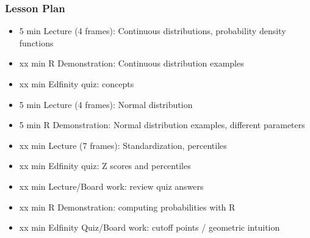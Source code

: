 \begin{frame}
    \frametitle{Lesson Plan}
    \begin{itemize}
        \item 5 min Lecture (4 frames): Continuous distributions, probability density functions
        \item xx min R Demonstration: Continuous distribution examples
        \item xx min Edfinity quiz: concepts

        \item 5 min Lecture (4 frames): Normal distribution
        \item 5 min R Demonstration: Normal distribution examples, different parameters
        \item xx min Lecture (7 frames): Standardization, percentiles
        \item xx min Edfinity quiz: Z scores and percentiles
        \item xx min Lecture/Board work: review quiz answers
        \item xx min R Demonstration: computing probabilities with R
        \item xx min Edfinity Quiz/Board work: cutoff points / geometric intuition
    \end{itemize}
\end{frame}




